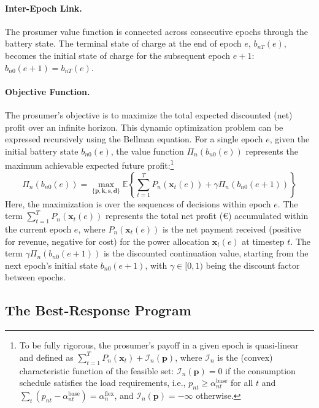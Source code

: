 \documentclass[12pt, notitlepage]{article}
\begin{document}
\paragraph{Inter-Epoch Link.}
The prosumer value function is connected across consecutive epochs through the battery state. The terminal state of charge at the end of epoch $e$, $b_{nT}(e)$, becomes the initial state of charge for the subsequent epoch $e+1$: $b_{n0}(e+1) = b_{nT}(e)$.

\paragraph{Objective Function.}
The prosumer's objective is to maximize the total expected discounted (net) profit over an infinite horizon. This dynamic optimization problem can be expressed recursively using the Bellman equation. For a single epoch $e$, given the initial battery state $b_{n0}(e)$, the value function $\Pi_n(b_{n0}(e))$ represents the maximum achievable expected future profit:\footnote{To be fully rigorous, the prosumer's payoff in a given epoch is quasi-linear and defined as $\sum_{t=1}^T P_n(\mathbf{x}_t) + \mathcal{I}_n(\mathbf{p})$, where $\mathcal{I}_n$ is the (convex) characteristic function of the feasible set:  $\mathcal{I}_n(\mathbf{p}) = 0$ if the consumption schedule satisfies the load requirements, i.e., $p_{nt} \ge \alpha^{\text{base}}_{nt}$ for all $t$ and $\sum_{t} (p_{nt} - \alpha^{\text{base}}_{nt}) = \alpha^{\text{flex}}_{n}$, and $\mathcal{I}_n(\mathbf{p}) = -\infty$ otherwise.}
\begin{equation}
\Pi_n(b_{n0}(e)) = \max_{\{\mathbf{p}, \mathbf{k}, \mathbf{s}, \mathbf{d}\}} \mathbb{E} \left\{ \sum_{t=1}^T P_n(\mathbf{x}_t(e)) + \gamma \Pi_n(b_{n0}(e+1)) \right\}
\label{eq:bellman_abstract}
\end{equation}
Here, the maximization is over the sequences of decisions within epoch $e$. The term $\sum_{t=1}^T P_n(\mathbf{x}_t(e))$ represents the total net profit (€) accumulated within the current epoch $e$, where $P_n(\mathbf{x}_t(e))$ is the net payment received (positive for revenue, negative for cost) for the power allocation $\mathbf{x}_t(e)$ at timestep $t$. The term $\gamma \Pi_n(b_{n0}(e+1))$ is the discounted continuation value, starting from the next epoch's initial state $b_{n0}(e+1)$, with $\gamma \in [0, 1)$ being the discount factor between epochs.


 
\subsection{The Best-Response Program}
\label{cref:BR-linear}
\end{document}
